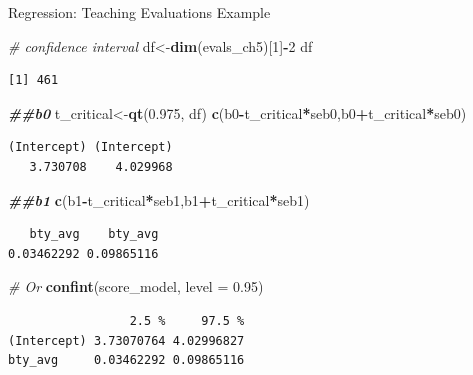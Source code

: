 \documentclass[
  ignorenonframetext,
]{beamer}
\newenvironment{Shaded}{\begin{snugshade}}{\end{snugshade}}
\newcommand{\AttributeTok}[1]{\textcolor[rgb]{0.13,0.29,0.53}{#1}}
\newcommand{\CommentTok}[1]{\textcolor[rgb]{0.56,0.35,0.01}{\textit{#1}}}
\newcommand{\DecValTok}[1]{\textcolor[rgb]{0.00,0.00,0.81}{#1}}
\newcommand{\DocumentationTok}[1]{\textcolor[rgb]{0.56,0.35,0.01}{\textbf{\textit{#1}}}}
\newcommand{\FloatTok}[1]{\textcolor[rgb]{0.00,0.00,0.81}{#1}}
\newcommand{\FunctionTok}[1]{\textcolor[rgb]{0.13,0.29,0.53}{\textbf{#1}}}
\newcommand{\NormalTok}[1]{#1}
\newcommand{\OtherTok}[1]{\textcolor[rgb]{0.56,0.35,0.01}{#1}}
\newcommand{\SpecialCharTok}[1]{\textcolor[rgb]{0.81,0.36,0.00}{\textbf{#1}}}
\begin{document}
\begin{frame}[fragile]{Regression: Teaching Evaluations Example}
\protect\hypertarget{regression-teaching-evaluations-example-10}{}
\tiny

\begin{Shaded}
\begin{Highlighting}[]
\CommentTok{\# confidence interval}
\NormalTok{df}\OtherTok{\textless{}{-}}\FunctionTok{dim}\NormalTok{(evals\_ch5)[}\DecValTok{1}\NormalTok{]}\SpecialCharTok{{-}}\DecValTok{2}
\NormalTok{df}
\end{Highlighting}
\end{Shaded}

\begin{verbatim}
[1] 461
\end{verbatim}

\begin{Shaded}
\begin{Highlighting}[]
\DocumentationTok{\#\#b0}
\NormalTok{t\_critical}\OtherTok{\textless{}{-}}\FunctionTok{qt}\NormalTok{(}\FloatTok{0.975}\NormalTok{, df)}
\FunctionTok{c}\NormalTok{(b0}\SpecialCharTok{{-}}\NormalTok{t\_critical}\SpecialCharTok{*}\NormalTok{seb0,b0}\SpecialCharTok{+}\NormalTok{t\_critical}\SpecialCharTok{*}\NormalTok{seb0)}
\end{Highlighting}
\end{Shaded}

\begin{verbatim}
(Intercept) (Intercept) 
   3.730708    4.029968 
\end{verbatim}

\begin{Shaded}
\begin{Highlighting}[]
\DocumentationTok{\#\#b1}
\FunctionTok{c}\NormalTok{(b1}\SpecialCharTok{{-}}\NormalTok{t\_critical}\SpecialCharTok{*}\NormalTok{seb1,b1}\SpecialCharTok{+}\NormalTok{t\_critical}\SpecialCharTok{*}\NormalTok{seb1)}
\end{Highlighting}
\end{Shaded}

\begin{verbatim}
   bty_avg    bty_avg 
0.03462292 0.09865116 
\end{verbatim}

\begin{Shaded}
\begin{Highlighting}[]
\CommentTok{\# Or}
\FunctionTok{confint}\NormalTok{(score\_model, }\AttributeTok{level =} \FloatTok{0.95}\NormalTok{)}
\end{Highlighting}
\end{Shaded}

\begin{verbatim}
                 2.5 %     97.5 %
(Intercept) 3.73070764 4.02996827
bty_avg     0.03462292 0.09865116
\end{verbatim}

\normalsize
\end{frame}
\end{document}
